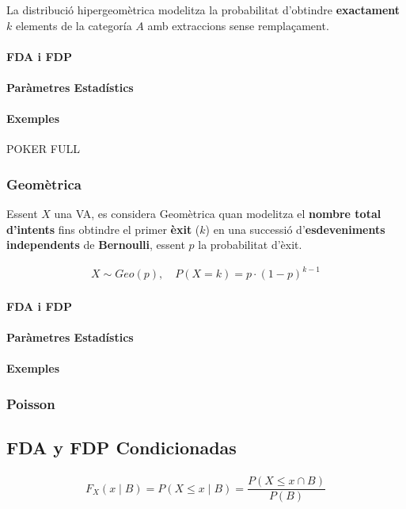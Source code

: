 \documentclass{article}
\begin{document}
La distribució hipergeomètrica modelitza la probabilitat d'obtindre \textbf{exactament} $k$ elements de la categoría $A$ amb extraccions sense remplaçament.

\paragraph{FDA i FDP}

\paragraph{Paràmetres Estadístics}

\paragraph{Exemples}
POKER FULL


\subsubsection{Geomètrica}
Essent $X$ una VA, es considera Geomètrica quan modelitza el \textbf{nombre total d'intents} fins obtindre el primer \textbf{èxit} ($k$) en una successió d'\textbf{esdeveniments} \textbf{independents} de \textbf{Bernoulli}, essent $p$ la probabilitat d'èxit.

\begin{align*}
    X \sim Geo(p), \quad P(X=k) = p \cdot (1-p)^{k-1}
\end{align*}

\paragraph{FDA i FDP}

\paragraph{Paràmetres Estadístics}

\paragraph{Exemples}

\subsubsection{Poisson}


\subsection{FDA y FDP Condicionadas}
\begin{align*}
F_X(x \mid B) = P(X\leq x\mid B) = \dfrac{P(X\leq x\cap B)}{P(B)}
\end{align*}
\end{document}
